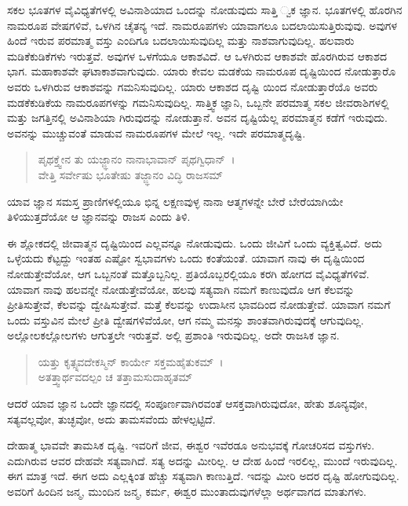 ಸಕಲ ಭೂತಗಳ ವೈವಿಧ್ಯತೆಗಳಲ್ಲಿ ಅವಿನಾಶಿಯಾದ ಒಂದನ್ನು ನೋಡುವುದು ಸಾತ್ತಿ ್ವಕ ಜ್ಞಾನ. ಭೂತಗಳಲ್ಲಿ ಹೊರಗಿನ ನಾಮರೂಪ ವೇಷಗಳಿವೆ, ಒಳಗಿನ ಚೈತನ್ಯ ಇದೆ. ನಾಮರೂಪಗಳು ಯಾವಾಗಲೂ ಬದಲಾಯಿಸುತ್ತಿರುವುವು. ಅವುಗಳ ಹಿಂದೆ ಇರುವ ಪರಮಾತ್ಮ ವಸ್ತು ಎಂದಿಗೂ ಬದಲಾಯಿಸುವುದಿಲ್ಲ ಮತ್ತು ನಾಶವಾಗುವುದಿಲ್ಲ. ಹಲವಾರು ಮಡಿಕೆಕುಡಿಕೆಗಳು ಇರುತ್ತವೆ. ಅವುಗಳ ಒಳಗೆಯೂ ಆಕಾಶವಿದೆ. ಆ ಒಳಗಿರುವ ಆಕಾಶವೇ ಹೊರಗಿರುವ ಆಕಾಶದ ಭಾಗ. ಮಹಾಕಾಶವೇ ಘಟಾಕಾಶವಾಗುವುದು. ಯಾರು ಕೇವಲ ಮಡಕೆಯ ನಾಮರೂಪ ದೃಷ್ಟಿಯಿಂದ ನೋಡುತ್ತಾರೊ ಅವರು ಒಳಗಿರುವ ಆಕಾಶವನ್ನು ಗಮನಿಸುವುದಿಲ್ಲ. ಯಾರು ಆಕಾಶದ ದೃಷ್ಟಿ ಯಿಂದ ನೋಡುತ್ತಾರೆಯೊ ಅವರು ಮಡಕೆಕುಡಿಕೆಯ ನಾಮರೂಪಗಳನ್ನು ಗಮನಿಸುವುದಿಲ್ಲ. ಸಾತ್ತ್ವಿಕ ಜ್ಞಾನಿ, ಒಬ್ಬನೇ ಪರಮಾತ್ಮ ಸಕಲ ಜೀವರಾಶಿಗಳಲ್ಲಿ ಮತ್ತು ಜಗತ್ತಿನಲ್ಲಿ ಅವಿನಾಶಿಯಾ ಗಿರುವುದನ್ನು ನೋಡುತ್ತಾನೆ. ಅವನ ದೃಷ್ಟಿಯೆಲ್ಲ ಪರಮಾತ್ಮನ ಕಡೆಗೆ ಇರುವುದು. ಅವನನ್ನು ಮುಚ್ಚುವಂತೆ ಮಾಡುವ ನಾಮರೂಪಗಳ ಮೇಲೆ ಇಲ್ಲ. ಇದೇ ಪರಮಾತ್ಮದೃಷ್ಟಿ.

\begin{verse}
ಪೃಥಕ್ತ್ವೇನ ತು ಯಜ್ಜ್ಞಾನಂ ನಾನಾಭಾವಾನ್ ಪೃಥಗ್ವಿಧಾನ್~।\\ವೇತ್ತಿ ಸರ್ವೇಷು ಭೂತೇಷು ತಜ್ಜ್ಞಾನಂ ವಿದ್ಧಿ ರಾಜಸಮ್ 
\end{verse}

{\small ಯಾವ ಜ್ಞಾನ ಸಮಸ್ತ ಪ್ರಾಣಿಗಳಲ್ಲಿಯೂ ಭಿನ್ನ ಲಕ್ಷಣವುಳ್ಳ ನಾನಾ ಆತ್ಮಗಳನ್ನೇ ಬೇರೆ ಬೇರೆಯಾಗಿಯೇ ತಿಳಿಯುತ್ತದೆಯೋ ಆ ಜ್ಞಾನವನ್ನು ರಾಜಸ ಎಂದು ತಿಳಿ.}

ಈ ಶ್ಲೋಕದಲ್ಲಿ ಜೀವಾತ್ಮನ ದೃಷ್ಟಿಯಿಂದ ಎಲ್ಲವನ್ನೂ ನೋಡುವುದು. ಒಂದು ಜೀವಿಗೆ ಒಂದು ವ್ಯಕ್ತಿತ್ವವಿದೆ. ಅದು ಒಳ್ಳೆಯದು ಕೆಟ್ಟದ್ದು ಇಂತಹ ಎಷ್ಟೋ ಸ್ವಭಾವಗಳು ಒಂದು ಕಂತೆಯಂತೆ. ಯಾವಾಗ ನಾವು ಈ ದೃಷ್ಟಿಯಿಂದ ನೋಡುತ್ತೇವೆಯೋ, ಆಗ ಒಬ್ಬನಂತೆ ಮತ್ತೊಬ್ಬನಿಲ್ಲ. ಪ್ರತಿಯೊಬ್ಬರಲ್ಲಿಯೂ ಕರಗಿ ಹೋಗದ ವೈವಿಧ್ಯತೆಗಳಿವೆ. ಯಾವಾಗ ನಾವು ಹಲವನ್ನೇ ನೋಡುತ್ತೇವೆಯೋ, ಹಲವು ಸತ್ಯವಾಗಿ ನಮಗೆ ಕಾಣುವುದೊ ಆಗ ಕೆಲವನ್ನು ಪ್ರೀತಿಸುತ್ತೇವೆ, ಕೆಲವನ್ನು ದ್ವೇಷಿಸುತ್ತೇವೆ. ಮತ್ತೆ ಕೆಲವನ್ನು ಉದಾಸೀನ ಭಾವದಿಂದ ನೋಡುತ್ತೇವೆ. ಯಾವಾಗ ನಮಗೆ ಒಂದು ವಸ್ತುವಿನ ಮೇಲೆ ಪ್ರೀತಿ ದ್ವೇಷಗಳಿವೆಯೋ, ಆಗ ನಮ್ಮ ಮನಸ್ಸು ಶಾಂತವಾಗಿರುವುದಕ್ಕೆ ಆಗುವುದಿಲ್ಲ. ಅಲ್ಲೋಲಕಲ್ಲೋಲಗಳು ಆಗುತ್ತಲೇ ಇರುತ್ತವೆ. ಅಲ್ಲಿ ಪ್ರಶಾಂತಿ ಇರುವುದಿಲ್ಲ. ಅದೇ ರಾಜಸಿಕ ಜ್ಞಾನ.

\begin{verse}
ಯತ್ತು ಕೃತ್ಸ್ನವದೇಕಸ್ಮಿನ್ ಕಾರ್ಯೇ ಸಕ್ತಮಹೈತುಕಮ್~।\\ಅತತ್ತ್ವಾರ್ಥವದಲ್ಪಂ ಚ ತತ್ತಾಮಸುದಾಹೃತಮ್ 
\end{verse}

{\small ಆದರೆ ಯಾವ ಜ್ಞಾನ ಒಂದೇ ಜ್ಞಾನದಲ್ಲಿ ಸಂಪೂರ್ಣವಾಗಿರವಂತೆ ಆಸಕ್ತವಾಗಿರುವುದೋ, ಹೇತು ಶೂನ್ಯವೋ, ಸತ್ಯವಲ್ಲವೋ, ತುಚ್ಛವೋ, ಅದು ತಾಮಸವೆಂದು ಹೇಳಲ್ಪಟ್ಟಿದೆ.}

ದೇಹಾತ್ಮ ಭಾವವೇ ತಾಮಸಿಕ ದೃಷ್ಟಿ. ಇವರಿಗೆ ಜೀವ, ಈಶ್ವರ ಇವೆರಡೂ ಅನುಭವಕ್ಕೆ ಗೋಚರಿಸದ ವಸ್ತುಗಳು. ಎದುಗಿರುವ ಆವರ ದೇಹವೇ ಸತ್ಯವಾಗಿದೆ. ಸತ್ಯ ಅದನ್ನು ಮೀರಿಲ್ಲ. ಆ ದೇಹ ಹಿಂದೆ ಇರಲಿಲ್ಲ, ಮುಂದೆ ಇರುವುದಿಲ್ಲ. ಈಗ ಮಾತ್ರ ಇದೆ. ಈಗ ಅದು ಎಲ್ಲಕ್ಕಿಂತ ಹೆಚ್ಚು ಸತ್ಯವಾಗಿ ಕಾಣುತ್ತಿದೆ. ಇದನ್ನು ಮೀರಿ ಅದರ ದೃಷ್ಟಿ ಹೋಗುವುದಿಲ್ಲ. ಅವರಿಗೆ ಹಿಂದಿನ ಜನ್ಮ, ಮುಂದಿನ ಜನ್ಮ, ಕರ್ಮ, ಈಶ್ವರ ಮುಂತಾದುವುಗಳೆಲ್ಲಾ ಅರ್ಥವಾಗದ ಮಾತುಗಳು.

